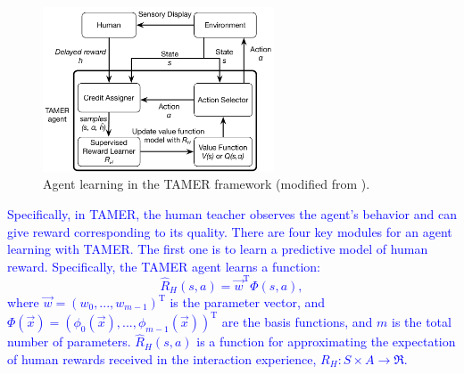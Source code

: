 

\begin{figure} [ht]
\centering
\includegraphics[width=2.7in]{TAMER.pdf}%
\caption{Agent learning in the TAMER framework (modified from \protect\cite{knox2012learning}). }
\label{tamer}
\end{figure}

\textcolor{blue}{Specifically, in TAMER, the human teacher observes the agent's behavior and can give reward corresponding to its quality. There are four key modules for an agent learning with TAMER. The first one is to learn a predictive model of human reward. Specifically, the TAMER agent learns a function:
\begin{equation}
 \hat{R}_{H}(s, a) = \vec{w}^{\mathrm{T}}\Phi(s,a), 
\end{equation}
where $\vec{w} = (w_{0}, ..., w_{m-1})^{\mathrm{T}}$ is the parameter vector, and $\Phi(\vec{x}) = (\phi_{0}(\vec{x}), ..., \phi_{m-1}(\vec{x}))^{\mathrm{T}}$ are the basis functions, and $m$ is the total number of parameters.  $\hat{R}_{H}(s, a)$ is a function for approximating the expectation of human rewards received in the interaction experience, ${R}_{H}: S \times A \rightarrow \Re$. }

